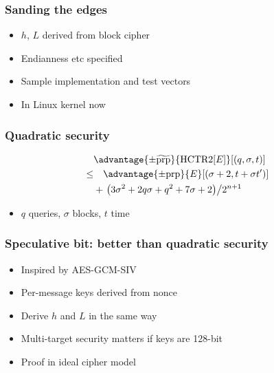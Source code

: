 \documentclass{beamer}
\begin{document}
\begin{frame}

\frametitle{Sanding the edges}

\begin{itemize}
    \item $h$, $L$ derived from block cipher
    \item Endianness etc specified
    \item Sample implementation and test vectors
    \item In Linux kernel now
\end{itemize}
\end{frame}

\begin{frame}

    \frametitle{Quadratic security}

    \begin{align*}
        &\advantage{\pm \widetilde{\mathrm{prp}}}{\HCTR[E]}[(q, \sigma, t)] \\
        \leq & \quad \advantage{\pm \mathrm{prp}}{E}[(\sigma + 2, t + \sigma t')] \\
        &+ \left.\left(3\sigma^2 + 2q\sigma + q^2 + 7\sigma + 2\right)\middle/2^{n+1}\right.
    \end{align*}
        

    \begin{itemize}
        \item \(q\) queries, \(\sigma\) blocks, \(t\) time
    \end{itemize}
\end{frame}
    
\begin{frame}
\frametitle{Speculative bit: better than quadratic security}

\begin{itemize}
    \item Inspired by AES-GCM-SIV
    \item Per-message keys derived from nonce
    \item Derive $h$ and $L$ in the same way
    \item Multi-target security matters if keys are 128-bit
    \item Proof in ideal cipher model
\end{itemize}
\end{frame}
\end{document}

